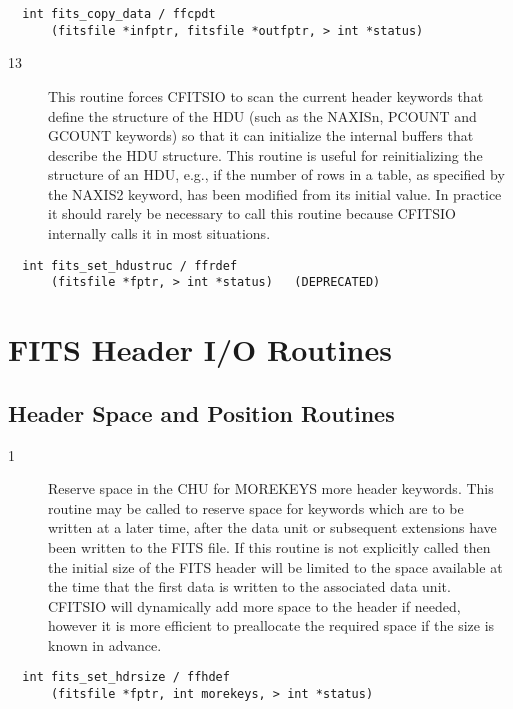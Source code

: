 \begin{verbatim}
  int fits_copy_data / ffcpdt
      (fitsfile *infptr, fitsfile *outfptr, > int *status)
\end{verbatim}

\begin{description}
\item[13] This routine forces CFITSIO to scan the current header keywords that
    define the structure of the HDU (such as the NAXISn, PCOUNT and GCOUNT
    keywords) so that it can initialize the internal buffers that describe
    the HDU structure.  This routine is
    useful for reinitializing the structure of an HDU, e.g.,
    if the number of rows in a table, as specified by the NAXIS2 keyword,
    has been modified from its initial value.  In practice it should
    rarely be necessary to call this routine because CFITSIO
   internally calls it in most situations.
\end{description}

\begin{verbatim}
  int fits_set_hdustruc / ffrdef
      (fitsfile *fptr, > int *status)   (DEPRECATED)
\end{verbatim}


\section{FITS Header I/O Routines}


\subsection{ Header Space and Position Routines \label{FFHDEF}}


\begin{description}
\item[1 ] Reserve space in the CHU for MOREKEYS more header keywords.
    This routine may be called to reserve space for keywords which are
    to be written at a later time, after the data unit or subsequent
    extensions have been written to the FITS file.  If this routine is
    not explicitly called then the initial size of the FITS header will be
    limited to the space available at the time that  the first data is written
    to the associated data unit.   CFITSIO will dynamically
    add more space to the header if needed, however it is more efficient
   to preallocate the required space if the size is known in advance.
\end{description}

\begin{verbatim}
  int fits_set_hdrsize / ffhdef
      (fitsfile *fptr, int morekeys, > int *status)
\end{verbatim}

